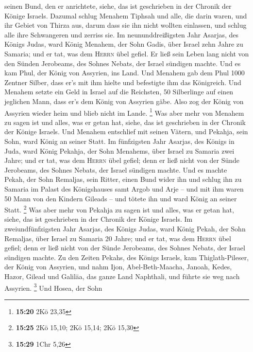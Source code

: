 seinen Bund, den er anrichtete, siehe, das ist geschrieben in der
Chronik der Könige Israels.  Dazumal schlug Menahem
Tiphsah und alle, die darin waren, und ihr Gebiet von Thirza aus, darum
dass sie ihn nicht wollten einlassen, und schlug alle ihre Schwangeren
und zerriss sie.  Im neununddreißigsten Jahr Asarjas, des
Königs Judas, ward König Menahem, der Sohn Gadis, über Israel zehn Jahre
zu Samaria;  und er tat, was dem \textsc{Herrn} übel
gefiel. Er ließ sein Leben lang nicht von den Sünden Jerobeams, des
Sohnes Nebats, der Israel sündigen machte.  Und es kam
Phul, der König von Assyrien, ins Land. Und Menahem gab dem Phul 1000
Zentner Silber, dass er's mit ihm hielte und befestigte ihm das
Königreich.  Und Menahem setzte ein Geld in Israel auf
die Reichsten, 50 Silberlinge auf einen jeglichen Mann, dass er's dem
König von Assyrien gäbe. Also zog der König von Assyrien wieder heim und
blieb nicht im Lande. \footnote{\textbf{15:20} 2Kö 23,35}
 Was aber mehr von Menahem zu sagen ist und alles, was er
getan hat, siehe, das ist geschrieben in der Chronik der Könige Israels.
 Und Menahem entschlief mit seinen Vätern, und Pekahja,
sein Sohn, ward König an seiner Statt.  Im fünfzigsten
Jahr Asarjas, des Königs in Juda, ward König Pekahja, der Sohn Menahems,
über Israel zu Samaria zwei Jahre;  und er tat, was dem
\textsc{Herrn} übel gefiel; denn er ließ nicht von der Sünde Jerobeams,
des Sohnes Nebats, der Israel sündigen machte.  Und es
machte Pekah, der Sohn Remaljas, sein Ritter, einen Bund wider ihn und
schlug ihn zu Samaria im Palast des Königshauses samt Argob und Arje --
und mit ihm waren 50 Mann von den Kindern Gileads -- und tötete ihn und
ward König an seiner Statt. \footnote{\textbf{15:25} 2Kö 15,10; 2Kö
  15,14; 2Kö 15,30}  Was aber mehr von Pekahja zu sagen
ist und alles, was er getan hat, siehe, das ist geschrieben in der
Chronik der Könige Israels.  Im zweiundfünfzigsten Jahr
Asarjas, des Königs Judas, ward König Pekah, der Sohn Remaljas, über
Israel zu Samaria 20 Jahre;  und er tat, was dem
\textsc{Herrn} übel gefiel; denn er ließ nicht von der Sünde Jerobeams,
des Sohnes Nebats, der Israel sündigen machte.  Zu den
Zeiten Pekahs, des Königs Israels, kam Thiglath-Pileser, der König von
Assyrien, und nahm Ijon, Abel-Beth-Maacha, Janoah, Kedes, Hazor, Gilead
und Galiläa, das ganze Land Naphthali, und führte sie weg nach Assyrien.
\footnote{\textbf{15:29} 1Chr 5,26}  Und Hosea, der Sohn

